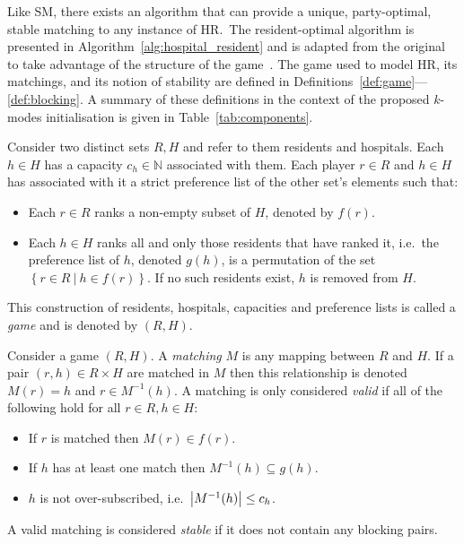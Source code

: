 Like SM, there exists an algorithm that can provide a unique, party-optimal,
stable matching to any instance of HR.\ The resident-optimal algorithm is
presented in Algorithm~\ref{alg:hospital_resident} and is adapted from the
original to take advantage of the structure of the game~\cite{Roth1984}. The
game used to model HR, its matchings, and its notion of stability are defined in
Definitions~\ref{def:game}---\ref{def:blocking}. A summary of these definitions
in the context of the proposed \(k\)-modes initialisation is given in
Table~\ref{tab:components}.

\begin{definition}\label{def:game}
    Consider two distinct sets \(R, H\) and refer to them residents and
    hospitals. Each \(h \in H\) has a capacity \(c_h \in \mathbb{N}\) associated
    with them. Each player \(r \in R\) and \(h \in H\) has associated 
    with it a strict preference list of the other set's elements such that:
    \begin{itemize}
        \item Each \(r \in R\) ranks a non-empty subset of \(H\), denoted by
            \(f(r)\).
        \item Each \(h \in H\) ranks all and only those residents that have
            ranked it, i.e.\ the preference list of \(h\), denoted \(g(h)\), is
            a permutation of the set
            \(\left\{r \in R \ | \ h \in f(r)\right\}\). If no such residents
            exist, \(h\) is removed from \(H\).
    \end{itemize}
    This construction of residents, hospitals, capacities and preference lists
    is called a \emph{game} and is denoted by \((R, H)\).
\end{definition}
\begin{definition}\label{def:matching}
    Consider a game \((R, H)\). A \emph{matching} \(M\) is any mapping between
    \(R\) and \(H\). If a pair \((r, h) \in R \times H\) are matched in \(M\)
    then this relationship is denoted \(M(r) = h\) and \(r \in M^{-1}(h)\).
    A matching is only considered \emph{valid} if all of the following hold for
    all \(r \in R, h \in H\):
    \begin{itemize}
        \item If \(r\) is matched then \(M(r) \in f(r)\).
        \item If \(h\) has at least one match then \(M^{-1}(h) \subseteq g(h)\).
        \item \(h\) is not over-subscribed, i.e.\ \(\abs*{M^{-1}(h)} \leq c_h\).
    \end{itemize}
    A valid matching is considered \emph{stable} if it does not contain any
    blocking pairs.
\end{definition}
